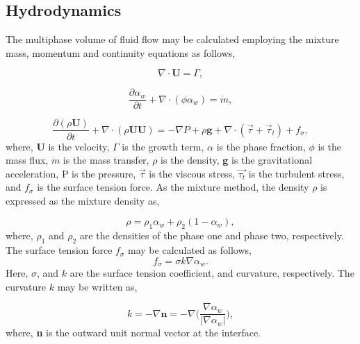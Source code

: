 \subsection{Hydrodynamics}
\label{Hydro}
The multiphase volume of fluid flow may be calculated employing the mixture mass, momentum and continuity equations as follows,

\begin{equation}
    \label{eq:continuity}
    \nabla \cdot \mathbf{U} = \Gamma,
\end{equation}

\begin{equation}
    \label{eq:mass}
    \frac{\partial \alpha_w}{\partial t} + \nabla\cdot (\phi \alpha_w) = \Dot{m},
\end{equation}

\begin{equation}
    \label{eq:momentum}
    \frac{\partial (\rho \mathbf{U})}{\partial t} + \nabla\cdot (\rho \mathbf{U U}) = -\nabla P + \rho \mathbf{g} +\nabla \cdot (\vec{\tau}+\vec{\tau}_t)+f_{\sigma},
\end{equation}
where, $\mathbf{U}$ is the velocity, $\Gamma$ is the growth term, $\alpha$ is the phase fraction, ${\phi}$ is the mass flux, ${\Dot{m}}$ is the mass transfer, ${\rho}$ is the density, \textbf{g} is the gravitational acceleration, P is the pressure, $\vec{\tau}$ is the viscous stress, $\vec{\tau_t}$ is the turbulent stress, and ${f_{\sigma}}$ is the surface tension force. As the mixture method, the density ${\rho}$ is expressed as the mixture density as,  

\begin{equation}
    \label{eq:mixtureDensity}
    \rho = \rho_1 \alpha_w + \rho_2 (1-\alpha_w),
\end{equation}
where, ${\rho_1}$ and ${\rho_2}$ are the densities of the phase one and phase two, respectively. The surface tension force ${f_{\sigma}}$ may be calculated as follows,
\begin{equation}
    \label{eq:surfaceTension}
    f_{\sigma} = \sigma k \nabla\alpha_w.
\end{equation}
Here, ${\sigma}$, and $k$ are the surface tension coefficient, and curvature, respectively. The curvature $k$ may be written as, 

\begin{equation}
    \label{eq:curvature}
    k = -\nabla \mathbf{n} = -\nabla \Bigg(\frac{\nabla \alpha_w}{\big| \nabla \alpha_w\big|} \Bigg),
\end{equation}
where, \textbf{n} is the outward unit normal vector at the interface.


